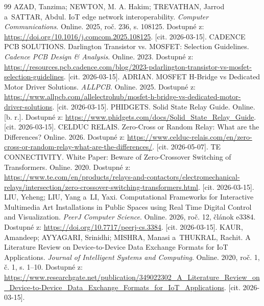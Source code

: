 \begin{thebibliography}{99}
    AZAD, Tanzima; NEWTON, M. A. Hakim; TREVATHAN, Jarrod
    a~SATTAR, Abdul.
    IoT edge network interoperability.
    \textit{Computer Communications}. Online. 2025,
    roč. 236, s. 108125.
    Dostupné z: \url{https://doi.org/10.1016/j.comcom.2025.108125}. [cit. 2026-03-15].
    CADENCE PCB SOLUTIONS.
    Darlington Transistor vs. MOSFET: Selection Guidelines.
    \textit{Cadence PCB Design \& Analysis}. Online. 2023.
    Dostupné z: \url{https://resources.pcb.cadence.com/blog/2023-pdarlington-transistor-vs-mosfet-selection-guidelines}. [cit. 2026-03-15].
    ADRIAN.
    MOSFET H-Bridge vs Dedicated Motor Driver Solutions.
    \textit{ALLPCB}. Online. 2025.
    Dostupné z: \url{https://www.allpcb.com/allelectrohub/mosfet-h-bridge-vs-dedicated-motor-driver-solutions}. [cit. 2026-03-15].
    PHIDGETS.
    Solid State Relay Guide. Online. [b. r.].
    Dostupné z: \url{https://www.phidgets.com/docs/Solid_State_Relay_Guide}. [cit. 2026-03-15].
    CELDUC RELAIS.
    Zero-Cross or Random Relay: What are the Differences? Online. 2026.
    Dostupné z: \url{https://www.celduc-relais.com/en/zero-cross-or-random-relay-what-are-the-differences/}. [cit. 2026-05-07].
    TE CONNECTIVITY.
    White Paper: Beware of Zero-Crossover Switching of Transformers.
    Online. 2020.
    Dostupné z: \url{https://www.te.com/en/products/relays-and-contactors/electromechanical-relays/intersection/zero-crossover-switching-transformers.html}. [cit. 2026-03-15].
    LIU, Yeheng; LIU, Yang a~LI, Yaxi.
    Computational Frameworks for Interactive Multimedia Art
    Installations in Public Spaces using Real Time Digital
    Control and Visualization.
    \textit{PeerJ Computer Science}. Online. 2026,
    roč. 12, článok e3384.
    Dostupné z: \url{https://doi.org/10.7717/peerj-cs.3384}. [cit. 2026-03-15].
    KAUR, Amandeep; AYYAGARI, Srinidhi; MISHRA, Manasi
    a~THUKRAL, Rachit.
    A Literature Review on Device-to-Device Data Exchange
    Formats for IoT Applications.
    \textit{Journal of Intelligent Systems and Computing}.
    Online. 2020, roč. 1, č. 1, s. 1--10.
    Dostupné z: \url{https://www.researchgate.net/publication/349022302_A_Literature_Review_on_Device-to-Device_Data_Exchange_Formats_for_IoT_Applications}. [cit. 2026-03-15].

\end{thebibliography}
